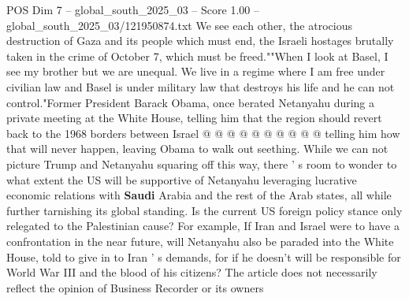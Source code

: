 \begin{textsample}{POS Dim 7 – global\_south\_2025\_03 – Score 1.00 – global\_south\_2025\_03/121950874.txt}
We see each other, the atrocious destruction of Gaza and its people which must end, the Israeli hostages brutally taken in the crime of October 7, which must be freed.""When I look at Basel, I see my brother but we are unequal.
We live in a regime where I am free under civilian law and Basel is under military law that destroys his life and he can not control."Former President Barack Obama, once berated Netanyahu during a private meeting at the White House, telling him that the region should revert back to the 1968 borders between Israel @ @ @ @ @ @ @ @ @ @ telling him how that will never happen, leaving Obama to walk out seething.
While we can not picture Trump and Netanyahu squaring off this way, there ' s room to wonder to what extent the US will be supportive of Netanyahu leveraging lucrative economic relations with \textbf{Saudi} Arabia and the rest of the Arab states, all while further tarnishing its global standing.
Is the current US foreign policy stance only relegated to the Palestinian cause?
For example, If Iran and Israel were to have a confrontation in the near future, will Netanyahu also be paraded into the White House, told to give in to Iran ' s demands, for if he doesn't will be responsible for World War III and the blood of his citizens?
The article does not necessarily reflect the opinion of Business Recorder or its owners

\end{textsample}
